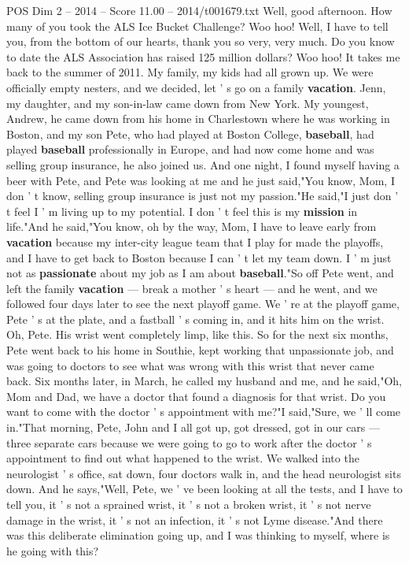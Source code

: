 \begin{textsample}{POS Dim 2 – 2014 – Score 11.00 – 2014/t001679.txt}  \label{ex:f2_pos_062}
Well, good afternoon.
How many of you took the ALS Ice Bucket Challenge?
Woo hoo!
Well, I have to tell you, from the bottom of our hearts, thank you so very, very much.
Do you know to date the ALS Association has raised 125 million dollars?
Woo hoo!
It takes me back to the summer of 2011.
My family, my kids had all grown up.
We were officially empty nesters, and we decided, let ' s go on a family \textbf{vacation}.
Jenn, my daughter, and my son-in-law came down from New York.
My youngest, Andrew, he came down from his home in Charlestown where he was working in Boston, and my son Pete, who had played at Boston College, \textbf{baseball}, had played \textbf{baseball} professionally in Europe, and had now come home and was selling group insurance, he also joined us.
And one night, I found myself having a beer with Pete, and Pete was looking at me and he just said,"You know, Mom, I don ' t know, selling group insurance is just not my passion."He said,"I just don ' t feel I ' m living up to my potential.
I don ' t feel this is my \textbf{mission} in life."And he said,"You know, oh by the way, Mom, I have to leave early from \textbf{vacation} because my inter-city league team that I play for made the playoffs, and I have to get back to Boston because I can ' t let my team down.
I ' m just not as \textbf{passionate} about my job as I am about \textbf{baseball}."So off Pete went, and left the family \textbf{vacation} — break a mother ' s heart — and he went, and we followed four days later to see the next playoff game.
We ' re at the playoff game, Pete ' s at the plate, and a fastball ' s coming in, and it hits him on the wrist.
Oh, Pete.
His wrist went completely limp, like this.
So for the next six months, Pete went back to his home in Southie, kept working that unpassionate job, and was going to doctors to see what was wrong with this wrist that never came back.
Six months later, in March, he called my husband and me, and he said,"Oh, Mom and Dad, we have a doctor that found a diagnosis for that wrist.
Do you want to come with the doctor ' s appointment with me?"I said,"Sure, we ' ll come in."That morning, Pete, John and I all got up, got dressed, got in our cars — three separate cars because we were going to go to work after the doctor ' s appointment to find out what happened to the wrist.
We walked into the neurologist ' s office, sat down, four doctors walk in, and the head neurologist sits down.
And he says,"Well, Pete, we ' ve been looking at all the tests, and I have to tell you, it ' s not a sprained wrist, it ' s not a broken wrist, it ' s not nerve damage in the wrist, it ' s not an infection, it ' s not Lyme disease."And there was this deliberate elimination going up, and I was thinking to myself, where is he going with this?

\end{textsample}
